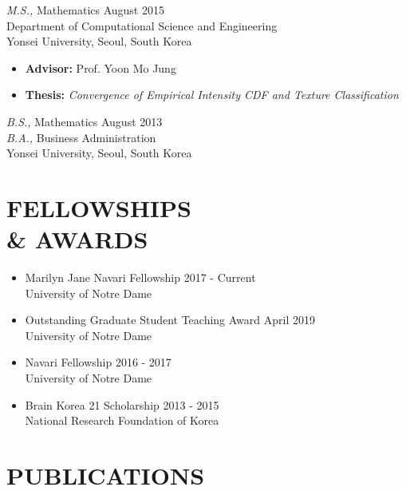 \documentclass[margin, 10pt]{res} %
\begin{document}
\begin{resume}
{\sl M.S.,} Mathematics \hfill August 2015 \\
Department of Computational Science and Engineering\\ 
Yonsei University, Seoul, South Korea
\begin{itemize} \itemsep -1.0pt
	\item {\bf Advisor:} Prof. Yoon Mo Jung
	\item {\bf Thesis:} \emph{Convergence of Empirical Intensity CDF and Texture Classification}
\end{itemize}

{\sl B.S.,} Mathematics \hfill August 2013\\
{\sl B.A.,} Business Administration \\
Yonsei University, Seoul, South Korea
\vspace{.2cm}


\section{\sf FELLOWSHIPS\\ \& AWARDS} 

\begin{itemize}
	\item Marilyn Jane Navari Fellowship \hfill 2017 - Current \\
	University of Notre Dame
	\item Outstanding Graduate Student Teaching Award \hfill April 2019 \\
	University of Notre Dame
	\item Navari Fellowship \hfill2016 - 2017 \\
	University of Notre Dame
	\item Brain Korea 21 Scholarship \hfill 2013 - 2015\\National Research Foundation of Korea 
\end{itemize}
\vspace{.2cm}




\section{\sf PUBLICATIONS} 


\end{resume}
\end{document}
